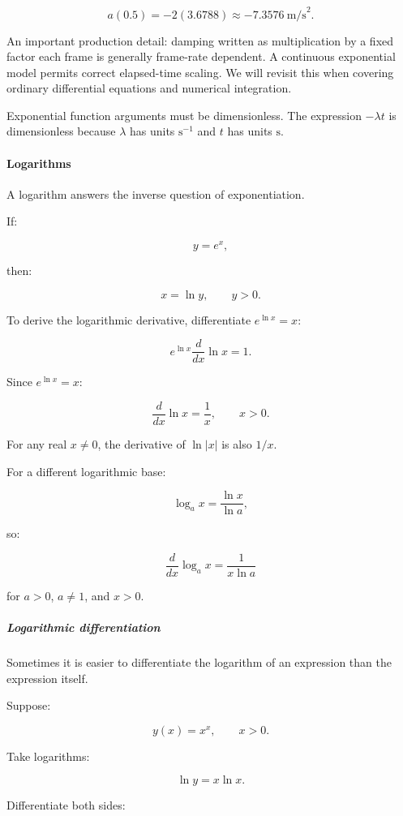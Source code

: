 \[
a(0.5)=-2(3.6788)\approx-7.3576\ \text{m/s}^2.
\]

An important production detail: damping written as multiplication by a fixed factor each frame is generally frame-rate dependent. A continuous exponential model permits correct elapsed-time scaling. We will revisit this when covering ordinary differential equations and numerical integration.

Exponential function arguments must be dimensionless. The expression \(-\lambda t\) is dimensionless because \(\lambda\) has units \(\mathrm{s}^{-1}\) and \(t\) has units \(\mathrm{s}\).

\paragraph{Logarithms}\label{01-foundations-i-ch020-logarithms}

A logarithm answers the inverse question of exponentiation.

If:

\[
y=e^x,
\]

then:

\[
x=\ln y,\qquad y>0.
\]

To derive the logarithmic derivative, differentiate \(e^{\ln x}=x\):

\[
e^{\ln x}\frac d{dx}\ln x=1.
\]

Since \(e^{\ln x}=x\):

\[
\boxed{\frac d{dx}\ln x=\frac1x},\qquad x>0.
\]

For any real \(x\ne0\), the derivative of \(\ln|x|\) is also \(1/x\).

For a different logarithmic base:

\[
\log_a x=\frac{\ln x}{\ln a},
\]

so:

\[
\boxed{\frac d{dx}\log_a x=\frac1{x\ln a}}
\]

for \(a>0\), \(a\ne1\), and \(x>0\).

\subparagraph{Logarithmic differentiation}\label{01-foundations-i-ch020-logarithmic-differentiation}

Sometimes it is easier to differentiate the logarithm of an expression than the expression itself.

Suppose:

\[
y(x)=x^x,\qquad x>0.
\]

Take logarithms:

\[
\ln y=x\ln x.
\]

Differentiate both sides:

